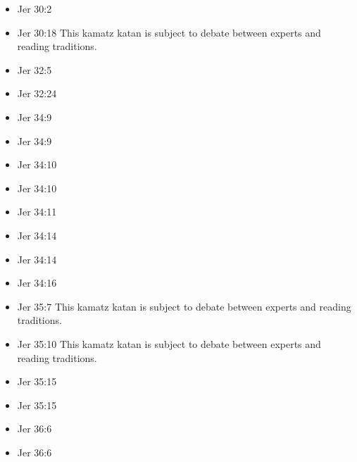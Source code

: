 \documentclass[14pt]{article}
\begin{document}
\begin{multicols}{2}
\begin{itemize}
								\item Jer 30:2
								
								
								\item Jer 30:18 This kamatz katan is subject to debate between experts and reading traditions.
								
								
								\item Jer 32:5
								
								\item Jer 32:24
								
								\item Jer 34:9
								
								\item Jer 34:9
								
								\item Jer 34:10
								
								\item Jer 34:10
								
								\item Jer 34:11
								
								\item Jer 34:14
								
								\item Jer 34:14
								
								\item Jer 34:16
								
								\item Jer 35:7 This kamatz katan is subject to debate between experts and reading traditions.
								
								\item Jer 35:10 This kamatz katan is subject to debate between experts and reading traditions.
								
								\item Jer 35:15
								
								\item Jer 35:15
								
								\item Jer 36:6
								
								\item Jer 36:6
								

\end{itemize}
\end{multicols}
\end{document}

